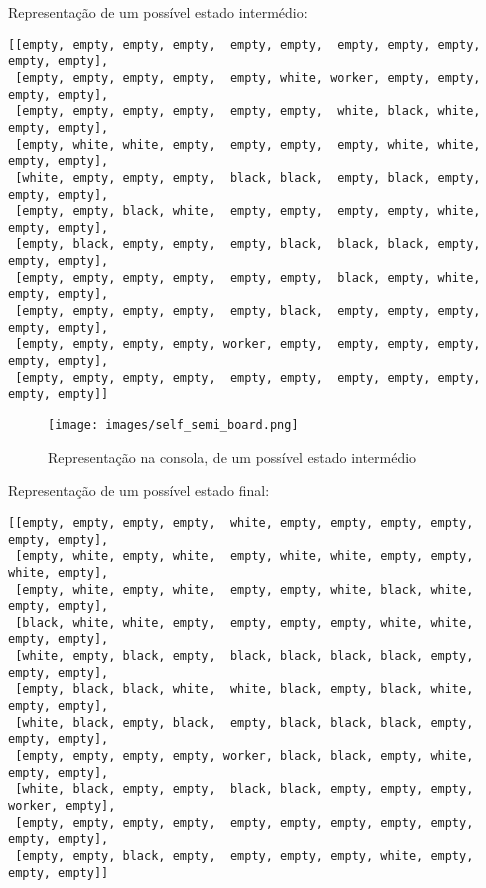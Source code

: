 \documentclass[a4paper]{article}
\begin{document}
\clearpage

Representação de um possível estado intermédio:\newline

\begin{small}
\begin{lstlisting}
[[empty, empty, empty, empty,  empty, empty,  empty, empty, empty, empty, empty],
 [empty, empty, empty, empty,  empty, white, worker, empty, empty, empty, empty],
 [empty, empty, empty, empty,  empty, empty,  white, black, white, empty, empty],
 [empty, white, white, empty,  empty, empty,  empty, white, white, empty, empty],
 [white, empty, empty, empty,  black, black,  empty, black, empty, empty, empty],
 [empty, empty, black, white,  empty, empty,  empty, empty, white, empty, empty],
 [empty, black, empty, empty,  empty, black,  black, black, empty, empty, empty],
 [empty, empty, empty, empty,  empty, empty,  black, empty, white, empty, empty],
 [empty, empty, empty, empty,  empty, black,  empty, empty, empty, empty, empty],
 [empty, empty, empty, empty, worker, empty,  empty, empty, empty, empty, empty],
 [empty, empty, empty, empty,  empty, empty,  empty, empty, empty, empty, empty]]
\end{lstlisting}
\end{small}

\begin{figure}[h!]
\begin{center}
	\texttt{[image: images/self\_semi\_board.png]}
	\caption{Representação na consola, de um possível estado intermédio}
	\label{Figura 6}
\end{center}
\end{figure}

\clearpage
Representação de um possível estado final:\newline

\begin{small}
\begin{lstlisting}
[[empty, empty, empty, empty,  white, empty, empty, empty, empty, empty, empty],
 [empty, white, empty, white,  empty, white, white, empty, empty, white, empty],
 [empty, white, empty, white,  empty, empty, white, black, white, empty, empty],
 [black, white, white, empty,  empty, empty, empty, white, white, empty, empty],
 [white, empty, black, empty,  black, black, black, black, empty, empty, empty],
 [empty, black, black, white,  white, black, empty, black, white, empty, empty],
 [white, black, empty, black,  empty, black, black, black, empty, empty, empty],
 [empty, empty, empty, empty, worker, black, black, empty, white, empty, empty],
 [white, black, empty, empty,  black, black, empty, empty, empty, worker, empty],
 [empty, empty, empty, empty,  empty, empty, empty, empty, empty, empty, empty],
 [empty, empty, black, empty,  empty, empty, empty, white, empty, empty, empty]]
\end{lstlisting}
\end{small}
\end{document}
